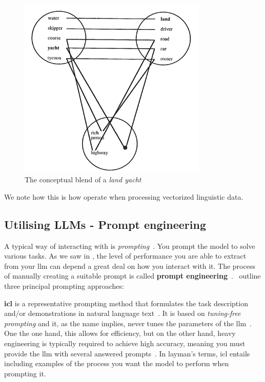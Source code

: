 \begin{figure}[h]
    \centering
    \includegraphics[width=0.8\textwidth]{figures/landYacht.png}
    \caption[Land yacht conceptual blend]{The conceptual blend of a \textit{land
            yacht}\footnotemark}\label{fig:landYacht}
\end{figure}


We note how this is how  operate when processing vectorized
linguistic data.


\subsection{Utilising LLMs - Prompt engineering}\label{sec:llmUtilization}


A typical way of interacting with  is \textit{prompting}~\cite[44]{llmSurvey}. You
prompt the model to solve various tasks. As we saw in , the level of
performance you are able to extract from your \acrlong{llm} can depend a great deal on how you
interact with it. The process of manually creating a suitable prompt is called \textbf{prompt
    engineering}~\cite[44]{llmSurvey}.~\citeauthor{llmSurvey} outline three principal prompting
approaches:

\textbf{\acrfull{icl}} is a representative prompting method that formulates the task
description and/or demonstrations in natural language text~\cite[44]{llmSurvey}. It is based on
\textit{tuning-free prompting} and it, as the name implies, never tunes the parameters of the
\acrshort{llm}~\cite[15]{promptingSurvey}. One the one hand, this allows for efficiency, but on the
other hand, heavy engineering is typically required to achieve high accuracy, meaning you must
provide the \acrshort{llm} with several answered prompts~\cite[16]{promptingSurvey}. In layman's
terms, \acrshort{icl} entails including examples of the process you want the model to perform when
prompting it.


